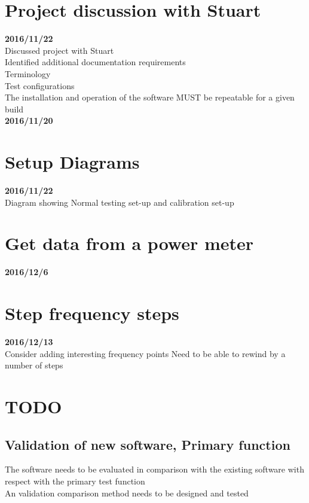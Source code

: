 \section{Project discussion with Stuart}\textbf{2016/11/22}\\
Discussed project with Stuart\\
Identified additional documentation requirements\:\\
Terminology\\
Test configurations\\
The installation and operation of the software MUST be repeatable for a given build\\
\textbf{2016/11/20}\\


\newpage
\section{Setup Diagrams}\textbf{2016/11/22}\\
Diagram showing Normal testing set-up and calibration set-up\\



\section{Get data from a power meter}\textbf{2016/12/6}\\


\section{Step frequency steps}\textbf{2016/12/13}\\


Consider adding interesting frequency points
Need to be able to rewind by a number of steps

\section{TODO}
\subsection{Validation of new software, Primary function}
The software needs to be evaluated in comparison with the existing software with respect with the primary test function\\
An validation comparison method needs to be designed and tested\\

